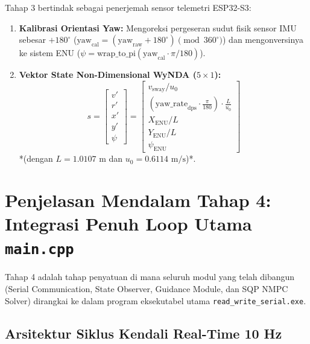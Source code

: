 \documentclass[11pt,a4paper]{article}
\begin{document}
Tahap 3 bertindak sebagai penerjemah sensor telemetri ESP32-S3:
\begin{enumerate}
    \item \textbf{Kalibrasi Orientasi Yaw:} Mengoreksi pergeseran sudut fisik sensor IMU sebesar $+180^\circ$ ($\text{yaw}_{\text{cal}} = (\text{yaw}_{\text{raw}} + 180^\circ) \pmod{360^\circ}$) dan mengonversinya ke sistem ENU ($\psi = \text{wrap\_to\_pi}(\text{yaw}_{\text{cal}} \cdot \pi/180)$).
    \item \textbf{Vektor State Non-Dimensional WyNDA ($5 \times 1$):}
    \begin{equation}
        s = \begin{bmatrix} v' \\ r' \\ x' \\ y' \\ \psi \end{bmatrix} = \begin{bmatrix} v_{\text{sway}} / u_0 \\ (\text{yaw\_rate}_{\text{dps}} \cdot \frac{\pi}{180}) \cdot \frac{L}{u_0} \\ X_{\text{ENU}} / L \\ Y_{\text{ENU}} / L \\ \psi_{\text{ENU}} \end{bmatrix}
    \end{equation}
    *(dengan $L = 1.0107\text{ m}$ dan $u_0 = 0.6114\text{ m/s}$)*.
\end{enumerate}

\section{Penjelasan Mendalam Tahap 4: Integrasi Penuh Loop Utama \texttt{main.cpp}}

Tahap 4 adalah tahap penyatuan di mana seluruh modul yang telah dibangun (Serial Communication, State Observer, Guidance Module, dan SQP NMPC Solver) dirangkai ke dalam program eksekutabel utama \texttt{read\_write\_serial.exe}.

\subsection{Arsitektur Siklus Kendali Real-Time 10 Hz}
\end{document}
